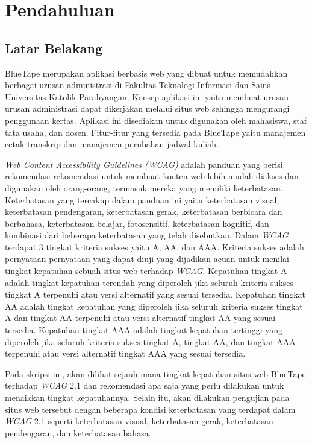 \chapter{Pendahuluan}
\label{chap:pendahuluan}
   
\section{Latar Belakang}
\label{sec:latarbelakang}
BlueTape \cite{BlueTape} merupakan aplikasi berbasis web yang dibuat untuk memudahkan berbagai urusan administrasi di Fakultas Teknologi Informasi dan Sains Universitas Katolik Parahyangan. Konsep aplikasi ini yaitu membuat urusan-urusan administrasi dapat dikerjakan melalui situs web sehingga mengurangi penggunaan kertas. Aplikasi ini disediakan untuk digunakan oleh mahasiswa, staf tata usaha, dan dosen. Fitur-fitur yang tersedia pada BlueTape yaitu manajemen cetak transkrip dan manajemen perubahan jadwal kuliah.

\textit{Web Content Accessibility Guidelines (WCAG)} \cite{WCAG:2.1} adalah panduan yang berisi rekomendasi-rekomendasi untuk membuat konten web lebih mudah diakses dan digunakan oleh orang-orang, termasuk mereka yang memiliki keterbatasan. Keterbatasan yang tercakup dalam panduan ini yaitu keterbatasan visual, keterbatasan pendengaran, keterbatasan gerak, keterbatasan berbicara dan berbahasa, keterbatasan belajar, fotosensitif, keterbatasan kognitif, dan kombinasi dari beberapa keterbatasan yang telah disebutkan. Dalam \textit{WCAG} terdapat 3 tingkat kriteria sukses yaitu A, AA, dan AAA. Kriteria sukses adalah pernyataan-pernyataan yang dapat diuji yang dijadikan acuan untuk menilai tingkat kepatuhan sebuah situs web terhadap \textit{WCAG}. Kepatuhan tingkat A adalah tingkat kepatuhan terendah yang diperoleh jika seluruh kriteria sukses tingkat A terpenuhi atau versi alternatif yang sesuai tersedia. Kepatuhan tingkat AA adalah tingkat kepatuhan yang diperoleh jika seluruh kriteria sukses tingkat A dan tingkat AA terpenuhi atau versi alternatif tingkat AA yang sesuai tersedia. Kepatuhan tingkat AAA adalah tingkat kepatuhan tertinggi yang diperoleh jika seluruh kriteria sukses tingkat A, tingkat AA, dan tingkat AAA terpenuhi atau versi alternatif tingkat AAA yang sesuai tersedia.

Pada skripsi ini, akan dilihat sejauh mana tingkat kepatuhan situs web BlueTape terhadap \textit{WCAG} 2.1 dan rekomendasi apa saja yang perlu dilakukan untuk menaikkan tingkat kepatuhannya. Selain itu, akan dilakukan pengujian pada situs web tersebut dengan beberapa kondisi keterbatasan yang terdapat dalam \textit{WCAG} 2.1 seperti keterbatasan visual, keterbatasan gerak, keterbatasan pendengaran, dan keterbatasan bahasa.

